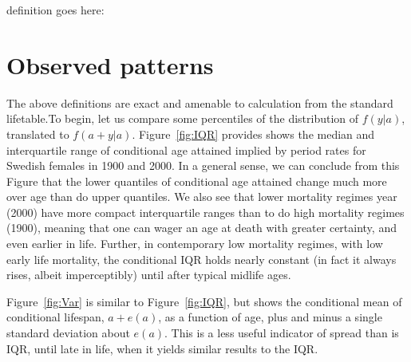 \documentclass{article}
\begin{document}
definition goes here:

\section*{Observed patterns}
The above definitions are exact and amenable to calculation from
the standard lifetable.To begin, let us
compare some percentiles of the distribution of $f(y|a)$, translated to
$f(a+y|a)$. Figure~\ref{fig:IQR} provides shows the median and interquartile
range of conditional age attained implied by period rates for Swedish females in
1900 and 2000. In a general sense, we can conclude from this Figure that the
lower quantiles of conditional age attained change much more over age than do
upper quantiles. We also see that lower mortality regimes year (2000) have more
compact interquartile ranges than to do high mortality regimes (1900), meaning
that one can wager an age at death with greater certainty, and even earlier in
life.
Further, in contemporary low mortality regimes, with low early life mortality, the
conditional IQR holds nearly constant (in fact it always rises, albeit
imperceptibly) until after typical midlife ages.

Figure~\ref{fig:Var} is similar to Figure~\ref{fig:IQR}, but shows the
conditional mean of conditional lifespan, $a+e(a)$, as a function of age, plus
and minus a single standard deviation about $e(a)$. This is a less useful
indicator of spread than is IQR, until late in life, when it yields similar
results to the IQR. 
\end{document}
